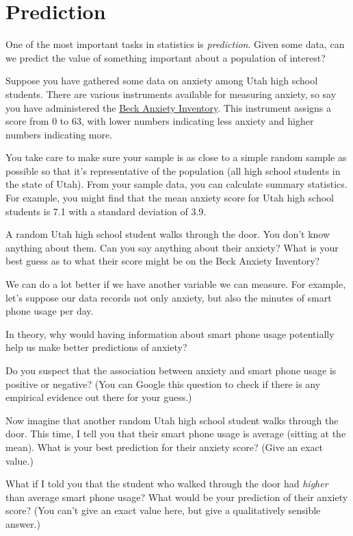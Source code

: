 \documentclass[
]{book}
\begin{document}
\hypertarget{simple-prediction}{%
\section{Prediction}\label{simple-prediction}}

One of the most important tasks in statistics is \emph{prediction}. Given some data, can we predict the value of something important about a population of interest?

Suppose you have gathered some data on anxiety among Utah high school students. There are various instruments available for measuring anxiety, so say you have administered the \href{https://en.wikipedia.org/wiki/Beck_Anxiety_Inventory}{Beck Anxiety Inventory}. This instrument assigns a score from 0 to 63, with lower numbers indicating less anxiety and higher numbers indicating more.

You take care to make sure your sample is as close to a simple random sample as possible so that it's representative of the population (all high school students in the state of Utah). From your sample data, you can calculate summary statistics. For example, you might find that the mean anxiety score for Utah high school students is 7.1 with a standard deviation of 3.9.

A random Utah high school student walks through the door. You don't know anything about them. Can you say anything about their anxiety? What is your best guess as to what their score might be on the Beck Anxiety Inventory?

We can do a lot better if we have another variable we can measure. For example, let's suppose our data records not only anxiety, but also the minutes of smart phone usage per day.

In theory, why would having information about smart phone usage potentially help us make better predictions of anxiety?

Do you suspect that the association between anxiety and smart phone usage is positive or negative? (You can Google this question to check if there is any empirical evidence out there for your guess.)

Now imagine that another random Utah high school student walks through the door. This time, I tell you that their smart phone usage is average (sitting at the mean). What is your best prediction for their anxiety score? (Give an exact value.)

What if I told you that the student who walked through the door had \emph{higher} than average smart phone usage? What would be your prediction of their anxiety score? (You can't give an exact value here, but give a qualitatively sensible answer.)
\end{document}

